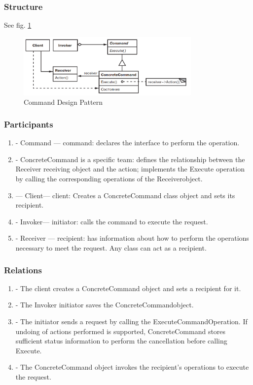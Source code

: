 \documentclass[sigplan,12pt,nonacm=true,review=false]{acmart}
\begin{document}
\subsubsection{Structure}
See fig. \ref{fig:11}
\begin{figure}[!t]
  \includegraphics[width=0.8\textwidth]{eolang/tr-02/assets/Picture11.png}
  \caption{Command Design Pattern}
  \label{fig:11}
\end{figure}

\subsubsection{Participants}
\begin{enumerate}
    \item - Command — command: declares the interface to perform the operation.
    \item -	ConcreteCommand is a specific  team: defines the relationship between the Receiver receiving object and the action; implements the Execute operation by calling the corresponding operations of the  Receiverobject.
    \item — Client— client: Creates a ConcreteCommand class object and sets its recipient.
    \item - Invoker— initiator: calls the command to execute the request.
    \item - Receiver  — recipient: has information about how to perform the operations necessary to meet the request. Any class can act as a recipient.
\end{enumerate}

\subsubsection{Relations}
\begin{enumerate}
    \item - The client creates a ConcreteCommand object and sets a recipient for it.
    \item - The Invoker initiator saves the  ConcreteCommandobject.
    \item - The initiator sends a request by calling the ExecuteCommandOperation. If undoing of actions performed is supported, ConcreteCommand  stores sufficient status information to perform the cancellation before calling  Execute.
    \item - The ConcreteCommand  object  invokes the recipient's operations to execute the request.
\end{enumerate}
\end{document}
